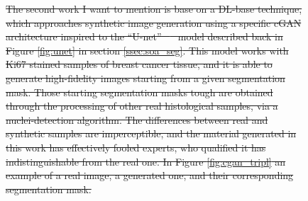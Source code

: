 \documentclass[12pt,a4paper]{report}
\providecommand{\DIFdeltex}[1]{{\protect\color{red}\sout{#1}}}                      %
\providecommand{\DIFdel}[1]{\texorpdfstring{\DIFdeltex{#1}}{}} %
\begin{document}
\begin{figure}

\DIFdel{The second work I want to mention is base on a DL-base technique, which approaches synthetic image generation using a specific cGAN architecture inspired to the ``U-net'' \mbox{%
\cite{Senaras2018} }\hspace{0pt}%
model described back in Figure \ref{fig:unet} in section \ref{ssec:soa_seg}.
This model works with Ki67 stained samples of breast cancer tissue, and it is able to generate high-fidelity images starting from a given segmentation mask. Those starting segmentation masks tough are obtained through the processing of other real histological samples, via a nuclei-detection algorithm. The differences between real and synthetic samples are imperceptible, and the material generated in this work has effectively fooled experts, who qualified it has indistinguishable from the real one. In Figure \ref{fig:cgan_tripl} an example of a real image, a generated one, and their corresponding segmentation mask.
}%


\end{figure}
\end{document}
